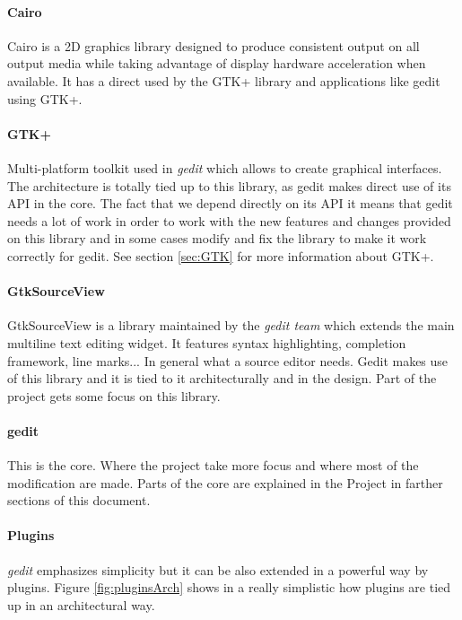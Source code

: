 \paragraph{Cairo}

Cairo is a 2D graphics library designed to produce consistent output on all output 
media while taking advantage of display hardware acceleration when available. It 
has a direct used by the GTK+ library and applications like gedit using GTK+.

\paragraph{GTK+}

Multi-platform toolkit used in \emph{gedit} which allows to create graphical interfaces.
The architecture is totally tied up to this library, as gedit makes direct use of its 
API in the core. The fact that we depend directly on its API it means that gedit 
needs a lot of work in order to work with the new features and changes provided 
on this library and in some cases modify and fix the library to make it work correctly 
for gedit. See section \ref{sec:GTK} for more information about GTK+.

\paragraph{GtkSourceView}

GtkSourceView is a library maintained by the \emph{gedit team} which extends the main 
multiline text editing widget. It features syntax highlighting, completion framework, 
line marks... In general what a source editor needs. Gedit makes use of this library 
and it is tied to it architecturally and in the design. Part of the project gets some 
focus on this library.

\paragraph{gedit}

This is the core. Where the project take more focus and where most of the modification 
are made. Parts of the core are explained in the Project in farther sections of this 
document.

\paragraph{Plugins}

\emph{gedit} emphasizes simplicity but it can be also extended in a powerful way 
by plugins. Figure \ref{fig:pluginsArch} shows in a really simplistic how plugins 
are tied up in an architectural way.

